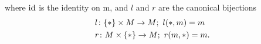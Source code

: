 \begin{figure}[H]
    \centering
    \begin{subfigure}{0.46\textwidth}
    \centering
    \end{subfigure}
    \hspace{2em}
    \begin{subfigure}{0.47\textwidth}
    \centering
    \end{subfigure}
    \end{figure}


where $\operatorname{id}$ is the identity on m, and $l$ and $r$ are the canonical bijections
\begin{align*}
    &l \colon \{\ast\} \times M \to M;\ l(\ast,m) = m \\
    &r \colon M \times \{\ast\} \to M;\ r(m,\ast) = m.
\end{align*}

